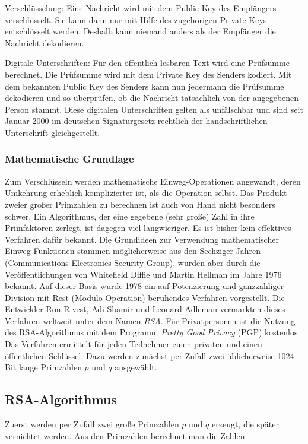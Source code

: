 Verschlüsselung: Eine Nachricht wird mit dem Public Key des Empfängers
verschlüsselt. Sie kann dann nur mit Hilfe des zugehörigen Private Keys
entschlüsselt werden. Deshalb kann niemand anders als der Empfänger die
Nachricht dekodieren.

Digitale Unterschriften: Für den öffentlich lesbaren Text wird eine Prüfsumme
berechnet. Die Prüfsumme wird mit dem Private Key des Senders kodiert. Mit dem
bekannten Public Key des Senders kann nun jedermann die Prüfsumme dekodieren
und so überprüfen, ob die Nachricht tatsächlich von der angegebenen Person
stammt. Diese digitalen Unterschriften gelten als unfälschbar und sind seit
Januar 2000 im deutschen Signaturgesetz rechtlich der handschriftlichen
Unterschrift gleichgestellt.

\subsubsection{Mathematische Grundlage}

Zum Verschlüsseln werden mathematische Einweg-Operationen angewandt, deren
Umkehrung erheblich komplizierter ist, als die Operation selbst. Das Produkt
zweier großer Primzahlen zu berechnen ist auch von Hand nicht besonders schwer.
Ein Algorithmus, der eine gegebene (sehr große) Zahl in ihre Primfaktoren
zerlegt, ist dagegen viel langwieriger. Es ist bisher kein effektives Verfahren
dafür bekannt. Die Grundideen zur Verwendung mathematischer Einweg-Funktionen
stammen möglicherweise aus den Sechziger Jahren (Communications Electronics
Security Group), wurden aber durch die Veröffentlichungen von Whitefield Diffie
und Martin Hellman im Jahre 1976 bekannt. Auf dieser Basis wurde 1978 ein auf
Potenzierung und ganzzahliger Division mit Rest (Modulo-Operation) beruhendes
Verfahren vorgestellt. Die Entwickler Ron Rivest, Adi Shamir und Leonard
Adleman vermarkten dieses Verfahren weltweit unter dem Namen \emph{RSA}. Für
Privatpersonen ist die Nutzung des RSA-Algorithmus mit dem Programm \emph{Pretty
Good Privacy} (PGP) kostenlos. Das Verfahren ermittelt für jeden Teilnehmer
einen privaten und einen öffentlichen Schlüssel. Dazu werden zunächst per
Zufall zwei üblicherweise 1024 Bit lange Primzahlen $p$ und $q$ ausgewählt.

\subsection{RSA-Algorithmus}

Zuerst werden per Zufall zwei große Primzahlen $p$ und $q$ erzeugt, die später
vernichtet werden. Aus den Primzahlen berechnet man die Zahlen

